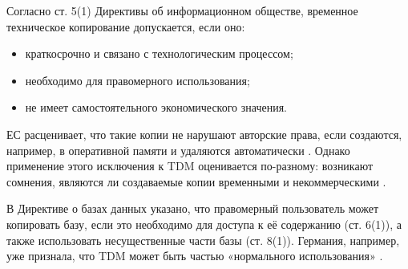Согласно ст. 5(1) Директивы об информационном обществе, временное техническое
копирование допускается, если оно:
\begin{itemize}
  \item краткосрочно и связано с технологическим процессом;
  \item необходимо для правомерного использования;
  \item не имеет самостоятельного экономического значения.
\end{itemize}

ЕС расценивает, что такие копии не нарушают авторские права, если создаются,
например, в оперативной памяти и удаляются автоматически \cite{muto2016,
triaille2014tdm}. Однако применение этого исключения к TDM оценивается
по-разному: возникают сомнения, являются ли создаваемые копии временными и
некоммерческими \cite{geiger2020tdm}.

В Директиве о базах данных указано, что правомерный пользователь может
копировать базу, если это необходимо для доступа к её содержанию (ст. 6(1)), а
также использовать несущественные части базы (ст. 8(1)). Германия, например,
уже признала, что TDM может быть частью «нормального использования»
\cite{triaille2014tdm}.

